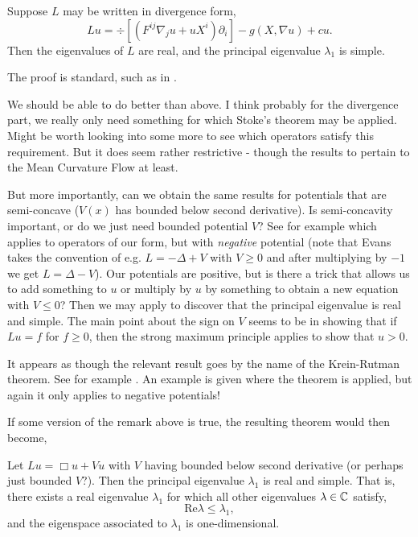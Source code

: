 \documentclass{amsart}
\begin{document}
\begin{thm}
Suppose \(L\) may be written in divergence form,
\[
L u = \div\left[\left(F^{ij} \nabla_j u + u X^i\right)\partial_i\right] - g(X, \nabla u) + c u.
\]
Then the eigenvalues of \(L\) are real, and the principal eigenvalue \(\lambda_1\) is simple.
\end{thm}

The proof is standard, such as in \cite[Theorems 8.37,8.38]{GilbargTrudinger:/2001}.

\begin{rem}
We should be able to do better than above. I think probably for the divergence part, we really only need something for which Stoke's theorem may be applied. Might be worth looking into some more to see which operators satisfy this requirement. But it does seem rather restrictive - though the results to pertain to the Mean Curvature Flow at least.
\end{rem}

\begin{rem}
But more importantly, can we obtain the same results for potentials that are semi-concave (\(V(x)\) has bounded below second derivative). Is semi-concavity important, or do we just need bounded potential \(V\)? See for example \cite[Theorem 6.5.3]{Evans:/1998} which applies to operators of our form, but with \emph{negative} potential (note that Evans takes the convention of e.g. \(L = -\Delta + V\) with \(V \geq 0\) and after multiplying by \(-1\) we get \(L = \Delta - V\)). Our potentials are positive, but is there a trick that allows us to add something to \(u\) or multiply by \(u\) by something to obtain a new equation with \(V \leq 0\)? Then we may apply \cite[Theorem 6.5.3]{Evans:/1998} to discover that the principal eigenvalue is real and simple. The main point about the sign on \(V\) seems to be in showing that if \(Lu = f\) for \(f \geq 0\), then the strong maximum principle applies to show that \(u > 0\).

It appears as though the relevant result goes by the name of the Krein-Rutman theorem. See for example \cite[Appendix C, Chapter 11]{smoller:/1983}. An example is given where the theorem is applied, but again it only applies to negative potentials!
\end{rem}

If some version of the remark above is true, the resulting theorem would then become,
\begin{thm}
Let \(L u = \Box u + V u\) with \(V\) having bounded below second derivative (or perhaps just bounded \(V\)?). Then the principal eigenvalue \(\lambda_1\) is real and simple. That is, there exists a real eigenvalue \(\lambda_1\) for which all other eigenvalues \(\lambda \in \mathbb{C}\) satisfy,
\[
\text{Re} \lambda \leq \lambda_1,
\]
and the eigenspace associated to \(\lambda_1\) is one-dimensional.
\end{thm}
\end{document}
